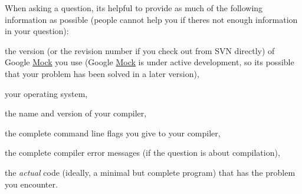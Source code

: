 When asking a question, it\textquotesingle{}s helpful to provide as much of the following information as possible (people cannot help you if there\textquotesingle{}s not enough information in your question)\+:


\begin{DoxyItemize}
\item the version (or the revision number if you check out from S\+VN directly) of Google \hyperlink{class_mock}{Mock} you use (Google \hyperlink{class_mock}{Mock} is under active development, so it\textquotesingle{}s possible that your problem has been solved in a later version),
\item your operating system,
\item the name and version of your compiler,
\item the complete command line flags you give to your compiler,
\item the complete compiler error messages (if the question is about compilation),
\item the {\itshape actual} code (ideally, a minimal but complete program) that has the problem you encounter. 
\end{DoxyItemize}